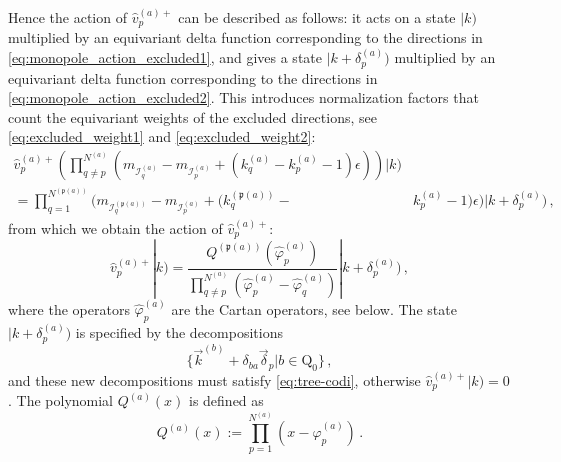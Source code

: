 \documentclass[12pt,a4paper]{article}
\renewcommand{\(}{\left(}
\renewcommand{\)}{\right)}
\renewcommand{\(}{\left(}
\renewcommand{\)}{\right)}
\begin{document}
\medskip

Hence the action of $\hat{v}^{(a)+}_p$ can be described as follows: it acts on a state $|k)$ multiplied by an equivariant delta function corresponding to the directions in \eqref{eq:monopole_action_excluded1}, and gives a state $|k+\delta^{(a)}_p)$ multiplied by an equivariant delta function corresponding to the directions in \eqref{eq:monopole_action_excluded2}.
This introduces normalization factors that count the equivariant weights of the excluded directions, see \eqref{eq:excluded_weight1} and \eqref{eq:excluded_weight2}: 
{\small
\begin{equation}
\begin{aligned}
 \hat{v}^{(a)+}_{p}\left(\prod_{q\neq p}^{N^{(a)}}(m_{\mathcal{I}^{(a)}_{q}}-m_{\mathcal{I}^{(a)}_{p}}+(k^{(a)}_{q}-k^{(a)}_{p}-1)\epsilon)\right)|k)&\\
 =\prod_{q=1}^{N^{(\mathfrak{p}(a))}}(m_{\mathcal{I}^{(\mathfrak{p}(a))}_{q}}-m_{\mathcal{I}^{(a)}_{p}}+(k^{(\mathfrak{p}(a))}_{q}-&k^{(a)}_{p}-1)\epsilon)|k+\delta^{(a)}_{p})\,,
\end{aligned}
\end{equation}}
from which we obtain the action of $\hat{v}^{(a)+}_p$:
\begin{equation}\label{eq:v+_action}
\hat{v}^{(a)+}_{p}|k)
 =\frac{Q^{(\mathfrak{p}(a))}(\hat{\varphi}^{(a)}_p)}{\prod_{q\neq p}^{N^{(a)}}(\hat{\varphi}^{(a)}_p-\hat{\varphi}^{(a)}_q)}|k+\delta^{(a)}_{p})\,,
\end{equation}
where the operators $\hat{\varphi}^{(a)}_p$ are the Cartan operators, see below. 
The state $|k+\delta^{(a)}_{p})$ is specified by the decompositions
\begin{equation}
\{\vec{k}^{(b)}+\delta_{ba}\vec{\delta}_p|b\in \textrm{Q}_0\}\,,
\end{equation}
and these new decompositions must satisfy \eqref{eq:tree-codi}, otherwise $\hat{v}^{(a)+}_{p}|k)=0$. 
The polynomial $Q^{(a)}(x)$ is defined as
\begin{equation}\label{eq:Qpolynomial}
Q^{(a)}(x):=\prod_{p=1}^{N^{(a)}}(x-\hat{\varphi}^{(a)}_{p})\,.
\end{equation} 
\end{document}
